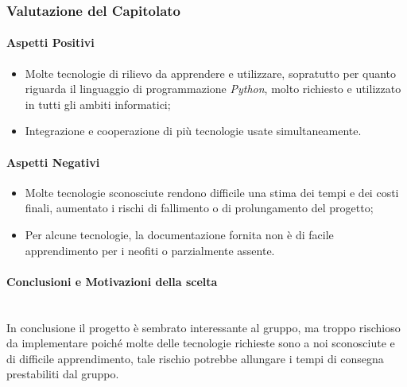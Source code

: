 \subsubsection{Valutazione del Capitolato}

\paragraph{Aspetti Positivi}
\begin{itemize}
	\item Molte tecnologie di rilievo da apprendere e utilizzare, sopratutto per quanto riguarda il linguaggio di programmazione \textit{Python}, molto richiesto e utilizzato in tutti gli ambiti informatici;
	\item Integrazione e cooperazione di più tecnologie usate simultaneamente. 
\end{itemize}

\paragraph{Aspetti Negativi}
\begin{itemize}
	\item Molte tecnologie sconosciute rendono difficile una stima dei tempi e dei costi finali, aumentato i rischi di fallimento o di prolungamento del progetto; 
	\item Per alcune tecnologie, la documentazione fornita non è di facile apprendimento per i neofiti o parzialmente assente. 
\end{itemize}


\paragraph{Conclusioni e Motivazioni della scelta}\-\\
In conclusione il progetto è sembrato interessante al gruppo, ma troppo rischioso da implementare poiché molte delle tecnologie richieste sono a noi sconosciute e di difficile apprendimento, tale rischio potrebbe allungare i tempi di consegna prestabiliti dal gruppo.  

